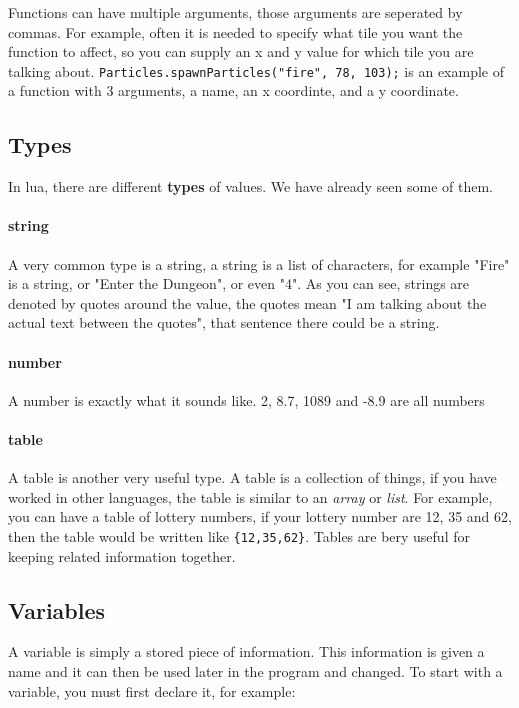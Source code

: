 \documentclass{book}
\begin{document}
Functions can have multiple arguments, those arguments are seperated by commas. For example, often it is needed to specify what tile you want the function to affect, so you can supply an x and y value for which tile you are talking about. \texttt{Particles.spawnParticles("fire", 78, 103);} is an example of a function with 3 arguments, a name, an x coordinte, and a y coordinate.

\subsection{Types}

In lua, there are different \textbf{types} of values. We have already seen some of them.

\paragraph{string}
A very common type is a string, a string is a list of characters, for example "Fire" is a string, or "Enter the Dungeon", or even "4". As you can see, strings are denoted by quotes around the value, the quotes mean "I am talking about the actual text between the quotes", that sentence there could be a string.

\paragraph{number}
A number is exactly what it sounds like. 2, 8.7, 1089 and -8.9 are all numbers

\paragraph{table}
A table is another very useful type. A table is a collection of things, if you have worked in other languages, the table is similar to an \textit{array} or \textit{list}. For example, you can have a table of lottery numbers, if your lottery number are 12, 35 and 62, then the table would be written like \texttt{\{12,35,62\}}. Tables are bery useful for keeping related information together.

\subsection{Variables}
A variable is simply a stored piece of information. This information is given a name and it can then be used later in the program and changed. To start with a variable, you must first declare it, for example:
\end{document}
